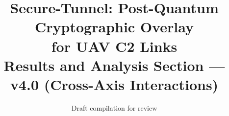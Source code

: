 \documentclass[conference,10pt]{IEEEtran}
\begin{document}
\title{Secure-Tunnel: Post-Quantum Cryptographic Overlay\\for UAV C2 Links\\
{\normalsize Results and Analysis Section --- v4.0 (Cross-Axis Interactions)}}
\author{Draft compilation for review}
\maketitle


\end{document}
